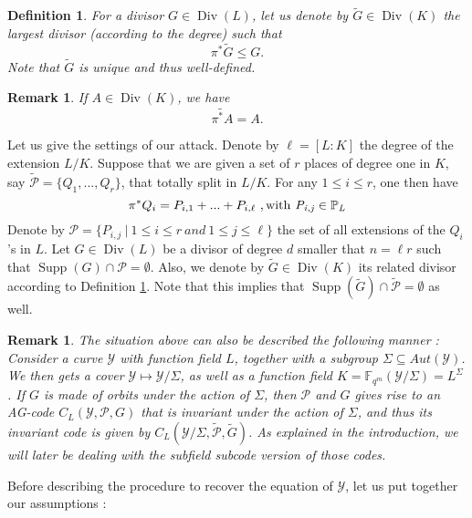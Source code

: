 \documentclass[10pt]{article}
\newtheorem{def1}[thm]{Definition}
\newtheorem{rq1}[thm]{Remark}
\newcommand{\s}{\vspace{0.3cm}}
\newcommand{\PP}{\mathbb{P}}
\newcommand{\fqm}{\mathbb{F}_{q^m}}
\newcommand{\su}{\subseteq}
\newcommand{\Y}{\mathcal{Y}}
\newcommand{\PR}{\mathcal{P}}
\newcommand{\Div}{\operatorname{Div}}
\newcommand{\Supp}{\operatorname{Supp}}
\begin{document}
\s

\begin{def1} \label{pousséavant}
For a divisor $G \in \Div(L)$, let us denote by $\tilde{G} \in \Div(K)$ the largest divisor (according to the degree) such that
\[\pi^*\tilde{G} \leq G.\]
Note that $\tilde{G}$ is unique and thus well-defined.
\end{def1} 

\s 

\begin{rq1} \label{jsp}
If $A \in \Div(K)$, we have 
\[\widetilde{\pi^*A}=A.\]
\end{rq1}

\s

Let us give the settings of our attack. Denote by $\ell=[L:K]$ the degree of the extension $L/K$. Suppose that we are given a set of $r$ places of degree one in $K$, say $\tilde{\PR} = \{Q_1,...,Q_r\}$, that totally split in $L/K$. For any $1 \leq i \leq r$, one then have 
\[\pi^*Q_i = P_{i,1} + ... + P_{i,\ell} \ , \rm with \it  \ P_{i,j} \in \PP_L\]
Denote by $\PR = \{P_{i,j} \ | \ 1 \leq i \leq r \ and \ 1 \leq j \leq \ell\}$ the set of all extensions of the $Q_i$'s in $L$. Let $G \in \Div(L)$ be a divisor of degree $d$ smaller that $n=\ell r$ such that $\Supp(G) \cap \PR = \emptyset$. Also, we denote by $\tilde{G} \in \Div(K)$ its related divisor according to Definition \ref{pousséavant}.
Note that this implies that $\Supp(\tilde{G}) \cap \tilde{\PR} = \emptyset$ as well. 

\s

\begin{rq1} \rm
The situation above can also be described the following manner : Consider a curve $\Y$ with function field $L$, together with a subgroup $\Sigma \su Aut(\Y)$. We then gets a cover $\Y \longmapsto \Y/\Sigma$, as well as a function field $K = \fqm(\Y/\Sigma) = L^{\Sigma}$. If $G$ is made of orbits under the action of $\Sigma$, then $\PR$ and $G$ gives rise to an AG-code $C_L(\Y,\PR,G)$ that is invariant under the action of $\Sigma$, and thus its invariant code is given by $C_L(\Y/\Sigma,\tilde{\PR},\tilde{G})$. As explained in the introduction, we will later be dealing with the subfield subcode version of those codes.  
\end{rq1}

\s

Before describing the procedure to recover the equation of $\Y$, let us put together our assumptions :
\end{document}
